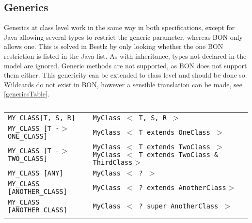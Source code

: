 \documentclass[11pt]{amsart}
\newcommand{\mytablebeg}{\begin{table}[h]\centering\begin{footnotesize}
\begin{tabular}{m{7cm}|m{7cm}} }
\newcommand{\mytableend}[2]{\end{tabular}\end{footnotesize}\caption{#1} \label{#2}\end{table}}
\newcommand{\simpleline}[2]{#1 & #2\\ \hdashline}
\begin{document}
\subsection{Generics}\hfill \newline
Generics at class level work in the same way in both specifications, except for Java allowing several types to restrict the generic parameter, whereas BON only allows one. This is solved in Beetlz by only looking whether the one BON restriction is listed in the Java list. As with inheritance, types not declared in the model are ignored. Generic methods are not supported, as BON does not support them either. This genericity can be extended to class level and should be done so.\\
Wildcards do not exist in BON, however a sensible translation can be made, see \autoref{genericsTable}.
\mytablebeg
\simpleline{\texttt{MY\_CLASS[T, S, R]}}{\texttt{MyClass $<$ T, S, R $>$}}
\simpleline{\texttt{MY\_CLASS [T -$>$ ONE\_CLASS]}}{\texttt{MyClass $<$ T extends OneClass $>$ }}
\simpleline{\texttt{MY\_CLASS [T -$>$ TWO\_CLASS]}}{\texttt{MyClass $<$ T extends TwoClass $>$ \newline MyClass $<$ T extends TwoClass \& ThirdClass$>$}}
\simpleline{\texttt{MY\_CLASS [ANY]}}{\texttt{MyClass $<$ ? $>$}}
\simpleline{\texttt{MY\_CLASS [ANOTHER\_CLASS]}}{\texttt{MyClass $<$ ? extends AnotherClass$>$}}
\simpleline{\texttt{MY\_CLASS [ANOTHER\_CLASS]}}{\texttt{MyClass $<$ ? super AnotherClass $>$}}
\mytableend{}{genericsTable}


\end{document}
